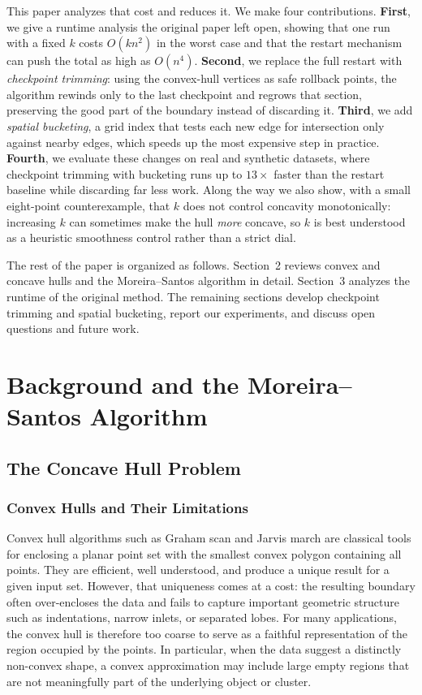 \documentclass[10pt,twocolumn]{article}
\begin{document}
This paper analyzes that cost and reduces it. We make four contributions. \textbf{First}, we give a runtime analysis the original paper left open, showing that one run with a fixed $k$ costs $O(kn^2)$ in the worst case and that the restart mechanism can push the total as high as $O(n^4)$. \textbf{Second}, we replace the full restart with \emph{checkpoint trimming}: using the convex-hull vertices as safe rollback points, the algorithm rewinds only to the last checkpoint and regrows that section, preserving the good part of the boundary instead of discarding it. \textbf{Third}, we add \emph{spatial bucketing}, a grid index that tests each new edge for intersection only against nearby edges, which speeds up the most expensive step in practice. \textbf{Fourth}, we evaluate these changes on real and synthetic datasets, where checkpoint trimming with bucketing runs up to $13\times$ faster than the restart baseline while discarding far less work. Along the way we also show, with a small eight-point counterexample, that $k$ does not control concavity monotonically: increasing $k$ can sometimes make the hull \emph{more} concave, so $k$ is best understood as a heuristic smoothness control rather than a strict dial.

The rest of the paper is organized as follows. Section~2 reviews convex and concave hulls and the Moreira--Santos algorithm in detail. Section~3 analyzes the runtime of the original method. The remaining sections develop checkpoint trimming and spatial bucketing, report our experiments, and discuss open questions and future work.
\section{Background and the Moreira--Santos Algorithm}
\subsection{The Concave Hull Problem}
\subsubsection{Convex Hulls and Their Limitations}
Convex hull algorithms such as Graham scan \citep{graham1972} and Jarvis march \citep{jarvis1973} are classical tools for enclosing a planar point set with the smallest convex polygon containing all points. They are efficient, well understood, and produce a unique result for a given input set. However, that uniqueness comes at a cost: the resulting boundary often over-encloses the data and fails to capture important geometric structure such as indentations, narrow inlets, or separated lobes.
For many applications, the convex hull is therefore too coarse to serve as a faithful representation of the region occupied by the points. In particular, when the data suggest a distinctly non-convex shape, a convex approximation may include large empty regions that are not meaningfully part of the underlying object or cluster.
\end{document}
